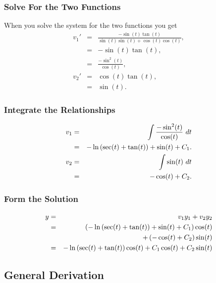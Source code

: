 \begin{frame}
  \frametitle{Solve For the Two Functions}

  When you solve the system for the two functions you get
  \begin{eqnarray*}
    v_1' & = & \frac{-\sin(t)\tan(t)}{\sin(t)\sin(t)+\cos(t)\cos(t)}, \\
    & = & -\sin(t)\tan(t), \\
    & = & \frac{-\sin^2(t)}{\cos(t)}, \\
    v_2' & = & \cos(t)\tan(t), \\
    & = & \sin(t).
  \end{eqnarray*}

\end{frame}


\begin{frame}
  \frametitle{Integrate the Relationships}

  \begin{eqnarray*}
    v_1 & = & \int \frac{-\sin^2(t)}{\cos(t)} ~ dt \\
    & = & -\ln\left(\sec(t)+\tan(t)\right) + \sin(t) + C_1. \\
    v_2 & = & \int \sin(t) ~ dt \\
    & = & -\cos(t) + C_2.
  \end{eqnarray*}

\end{frame}


\begin{frame}
  \frametitle{Form the Solution}

  \begin{eqnarray*}
    y & = & v_1 y_1 + v_2 y_2 \\
    & = & \left( -\ln\left(\sec(t)+\tan(t)\right) + \sin(t) + C_1 \right) \cos(t) \\
    & &
    + \left( -\cos(t) + C_2 \right) \sin(t) \\
    & = & - \ln\left(\sec(t)+\tan(t)\right) \cos(t) + C_1 \cos(t) + C_2 \sin(t)
  \end{eqnarray*}

\end{frame}

\subsection{General Derivation}

